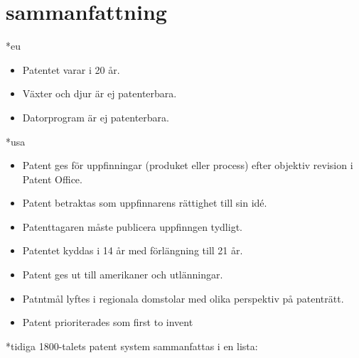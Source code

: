 \section{sammanfattning}

*eu



\begin{itemize}
	\item Patentet varar i 20 år.
	\item Växter och djur är ej patenterbara.
	\item Datorprogram är ej patenterbara.
\end{itemize}	


*usa

\begin{itemize}
	\item Patent ges för uppfinningar (produket eller process) efter objektiv revision i Patent Office.
	\item Patent betraktas som uppfinnarens rättighet till sin idé.
	\item Patenttagaren måste publicera uppfinngen tydligt.
	\item Patentet kyddas i 14 år med förlängning till 21 år.
	\item Patent ges ut till amerikaner och utlänningar.
	\item Patntmål lyftes i regionala domstolar med olika perspektiv på patenträtt.
	\item Patent prioriterades som first to invent
\end{itemize}

*tidiga 1800-talets patent system sammanfattas i en lista:

